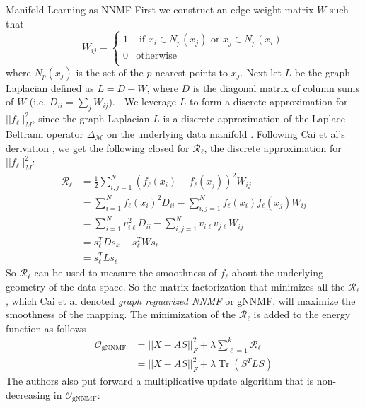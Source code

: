 \documentclass[12pt]{pom_thesis}
\begin{document}
\begin{chapter}{Manifold Learning as NNMF}
	First we construct an edge weight matrix $W$ such that
	 $$W_{ij} = \begin{cases} 
	1 & \textrm{ if $x_i \in N_p(x_j)$ or $x_j \in N_p(x_i)$} \\
	0 & \text{otherwise} \\
	\end{cases} $$
	where $N_p(x_j)$ is the set of the $p$ nearest points to $x_j$. Next let $L$ be the graph Laplacian defined as $L=D-W$, where $D$ is the diagonal matrix of column sums of $W$ (i.e. $D_{ii} = \sum_j W_{ij}$). \cite{chung1997spectral}. We leverage $L$ to form a discrete approximation for $||f_\ell||^2_M$, since the graph Laplacian $L$ is a discrete approximation of the Laplace-Beltrami operator $\Delta_\mathcal{M}$ on the underlying data manifold \cite{belkin2003problems}. Following Cai et al's derivation \cite{cai2008non}, we get the following closed for $\mathcal{R}_\ell$, the discrete approximation for $||f_\ell||^2_M$:
	\begin{align*}
\mathcal{R}_\ell &= \frac{1}{2} \sum_{i,j=1}^N (f_\ell(x_i)-f_\ell(x_j))^2W_{ij}\\
&=\sum_{i=1}^N f_\ell(x_i)^2 D_{ii}  - \sum_{i,j=1}^N f_\ell(x_i)f_\ell(x_j)W_{ij} \\
&= \sum_{i=1}^N v_{i\ell}^2 D_{ii}  - \sum_{i,j=1}^N v_{i\ell}v_{j\ell}W_{ij} \\ 
&= s_\ell^TDs_k - s_\ell^TWs_\ell \\
&= s_\ell^TLs_\ell
	\end{align*}
So $\mathcal{R}_\ell$ can be used to measure the smoothness of $f_\ell$ about the underlying geometry of the data space. So the matrix factorization that minimizes all the $\mathcal{R}_\ell$, which Cai et al denoted \textit{graph reguarized NNMF} or gNNMF, will maximize the smoothness of the mapping. The minimization of the  $\mathcal{R}_\ell$ is added to the energy function as follows
\begin{align}
\label{O:gNNMF}
\mathcal{O}_{\text{gNNMF}} &= ||X-AS||^2_F + \lambda \sum_{\ell=1}^k \mathcal{R}_\ell \\&=  ||X-AS||^2_F + \lambda \operatorname{Tr}(S^TLS)
\end{align}
The authors also put forward a multiplicative update algorithm that is non-decreasing in $\mathcal{O}_{\text{gNNMF}} $: 


\end{chapter}
\end{document}
